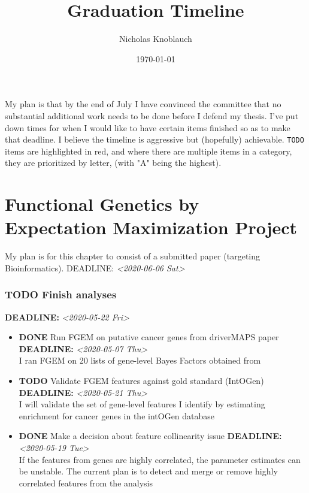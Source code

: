 \documentclass[11pt]{article}
\author{Nicholas Knoblauch}
\date{\today}
\title{Graduation Timeline}
\begin{document}
\maketitle
My plan is that by the end of July I have convinced the committee that no substantial additional work needs to be done before I defend my thesis. 
 I've put down times for when I would like to have certain items finished so as to make that deadline.  I believe the timeline is aggressive but (hopefully) achievable. 
\texttt{TODO} items are highlighted in red, and where there are multiple items in a category, they are prioritized by letter, (with "A" being the highest).

\section*{Functional Genetics by Expectation Maximization Project}
\label{sec:orgbabf710}
My plan is for this chapter to consist of a submitted paper (targeting Bioinformatics).
DEADLINE: \textit{<2020-06-06 Sat>}
\subsubsection*{{\bfseries\sffamily TODO} Finish analyses}
\label{sec:org8d9711c}
\noindent\textbf{DEADLINE:} \textit{<2020-05-22 Fri>}\\
\begin{itemize}
\item {\bfseries\sffamily DONE}  Run FGEM on putative cancer genes from driverMAPS paper
\label{sec:org25905e2}
\noindent\textbf{DEADLINE:} \textit{<2020-05-07 Thu>}\\
I ran FGEM on 20 lists of gene-level Bayes Factors obtained from \cite{zhao19_detail_model_posit_selec_improv}
\item {\bfseries\sffamily TODO}  Validate FGEM features against gold standard (IntOGen)
\label{sec:orgc16920b}
\noindent\textbf{DEADLINE:} \textit{<2020-05-21 Thu>}\\
I will validate the set of gene-level features I identify by estimating enrichment for cancer genes in the intOGen database \cite{gonzalez-perez13_intog_mutat_ident_cancer_driver}
\item {\bfseries\sffamily DONE}  Make a decision about feature collinearity issue
\label{sec:org2fbafbf}
\noindent\textbf{DEADLINE:} \textit{<2020-05-19 Tue>}\\
If the features from genes are highly correlated, the parameter estimates can be unstable. The current plan is to 
detect and merge or remove highly correlated features from the analysis
\end{itemize}
\end{document}
